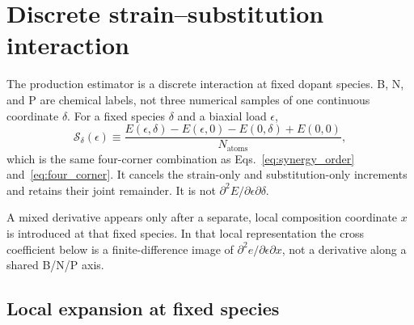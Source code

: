 
\section{Discrete strain--substitution interaction}
\label{sec:appendix_fd}

The production estimator is a discrete interaction at fixed dopant species.
B, N, and P are chemical labels, not three numerical samples of one continuous coordinate $\delta$.
For a fixed species $\delta$ and a biaxial load $\epsilon$,
\begin{equation}
\mathcal{S}_\delta(\epsilon)
\equiv
\frac{
E(\epsilon,\delta)-E(\epsilon,0)-E(0,\delta)+E(0,0)
}{N_{\mathrm{atoms}}},
\label{eq:S_mixed}
\end{equation}
which is the same four-corner combination as Eqs.~\eqref{eq:synergy_order} and~\eqref{eq:four_corner}.
It cancels the strain-only and substitution-only increments and retains their joint remainder.
It is not $\partial^2 E/\partial\epsilon\partial\delta$.

A mixed derivative appears only after a separate, local composition coordinate $x$ is introduced at that fixed species.
In that local representation the cross coefficient below is a finite-difference image of $\partial^2 e/\partial\epsilon\partial x$, not a derivative along a shared B/N/P axis.

\subsection{Local expansion at fixed species}
\label{sec:taylor}


